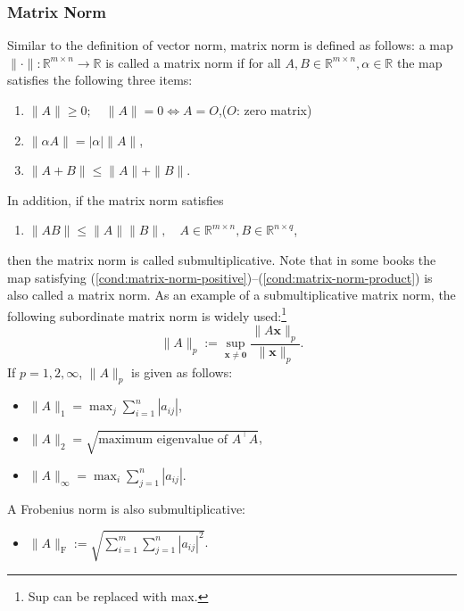 \subsubsection{{Matrix Norm}}\label{subsec:matrix-norm}
{Similar to the definition of vector norm, matrix norm is defined as follows: a map $\|\cdot\|:\mathbb R^{m\times n}\to\mathbb R$ is called a matrix norm if for all $A,B\in\mathbb R^{m\times n},\alpha\in\mathbb R$ the map satisfies the following three items:}
\begin{enumerate}[label=(Nm\arabic*),ref=Nm\arabic*]
\item\label{cond:matrix-norm-positive} $\|A\|\ge0;\quad\|A\|=0\iff A=O$,\quad ($O$: {zero matrix})
\item\label{cond:matrix-norm-homogeneous} $\|\alpha A\|=|\alpha|\|A\|$,
\item\label{cond:matrix-norm-triangle} $\|A+B\|\le\|A\|+\|B\|$.
\end{enumerate}
{In addition, if the matrix norm satisfies}
\begin{enumerate}[label=(Nm\arabic*),ref=Nm\arabic*,start=4]
\item\label{cond:matrix-norm-product} $\|AB\|\le\|A\|\|B\|,\quad A\in\mathbb R^{m\times n},B\in\mathbb R^{n\times q}$,
\end{enumerate}
{then the matrix norm is called submultiplicative. Note that in some books the map satisfying (\ref{cond:matrix-norm-positive})--(\ref{cond:matrix-norm-product}) is also called a matrix norm. As an example of a submultiplicative matrix norm, the following subordinate matrix norm is widely used:\footnote{Sup can be replaced with max.}}
\begin{equation}\label{eq:subordinate-matrix-norm}
\|A\|_p:=\sup_{\bm x\ne\bm0}\frac{\|A\bm x\|_p}{\|\bm x\|_p}.
\end{equation}
{If $p=1,2,\infty$, $\|A\|_p$ is given as follows:}
\begin{itemize}
\item $\|A\|_1=\max_j\sum_{i=1}^n|a_{ij}|$,
\item $\|A\|_2=\sqrt{\text{maximum eigenvalue of }A^\top A}$,
\item $\|A\|_\infty=\max_i\sum_{j=1}^n|a_{ij}|$.
\end{itemize}
{A Frobenius norm is also submultiplicative:}
\begin{itemize}\item $\|A\|_{\mathrm F}:=\sqrt{\sum_{i=1}^m\sum_{j=1}^n|a_{ij}|^2}$.\end{itemize}
